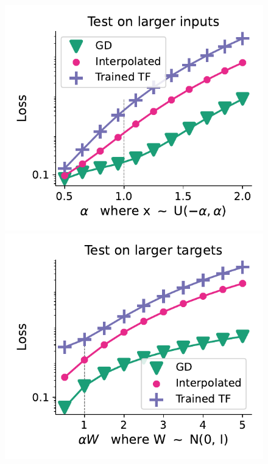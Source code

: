 \documentclass{article}
\theoremstyle{plain}
\theoremstyle{definition}
\theoremstyle{remark}
\begin{document}
\begin{figure}
\begin{center}
\begin{minipage}{.24\textwidth}
\begin{center}
  \end{center}
  \vspace{-10pt}
\end{minipage}
\begin{minipage}{.24\textwidth}
  \centering
  \begin{center}
    \includegraphics[width=1.\textwidth]{Final_figures/cycle/128/normal_27.pdf}
  \end{center}
  \vspace{-10pt}
\end{minipage}
\begin{minipage}{.24\textwidth}
  \centering
  \begin{center}
    \includegraphics[width=1.\textwidth]{Final_figures/cycle/128/normal_28.pdf}
  \end{center}
  \vspace{-10pt}
\end{minipage}
\end{center}


\end{figure}
\end{document}

